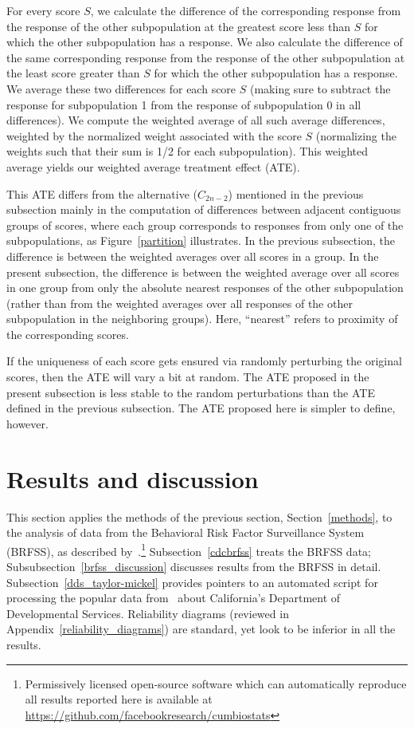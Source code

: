 \documentclass[]{fairmeta}
\begin{document}
For every score $S$, we calculate the difference of the corresponding response
from the response of the other subpopulation at the greatest score less than
$S$ for which the other subpopulation has a response. We also calculate
the difference of the same corresponding response from the response
of the other subpopulation at the least score greater than $S$
for which the other subpopulation has a response.
We average these two differences for each score $S$
(making sure to subtract the response for subpopulation 1
from the response of subpopulation 0 in all differences).
We compute the weighted average of all such average differences,
weighted by the normalized weight associated with the score $S$
(normalizing the weights such that their sum is 1/2 for each subpopulation).
This weighted average yields our weighted average treatment effect (ATE).

This ATE differs from the alternative ($C_{2n-2}$) mentioned
in the previous subsection mainly in the computation of differences between
adjacent contiguous groups of scores, where each group corresponds to responses
from only one of the subpopulations, as Figure~\ref{partition} illustrates.
In the previous subsection, the difference is between the weighted averages
over all scores in a group. In the present subsection,
the difference is between the weighted average over all scores in one group
from only the absolute nearest responses of the other subpopulation
(rather than from the weighted averages over all responses
of the other subpopulation in the neighboring groups).
Here, ``nearest'' refers to proximity of the corresponding scores.

If the uniqueness of each score gets ensured via randomly perturbing
the original scores, then the ATE will vary a bit at random.
The ATE proposed in the present subsection is less stable
to the random perturbations than the ATE defined in the previous subsection.
The ATE proposed here is simpler to define, however.



\section{Results and discussion}
\label{results}

This section applies the methods of the previous section,
Section~\ref{methods}, to the analysis of data
from the Behavioral Risk Factor Surveillance System (BRFSS),
as described by~\cite{brfss}.\footnote{Permissively licensed
open-source software which can automatically reproduce all results
reported here is available at
\url{https://github.com/facebookresearch/cumbiostats}}
Subsection~\ref{cdcbrfss} treats the BRFSS data;
Subsubsection~\ref{brfss_discussion} discusses results from the BRFSS
in detail.
Subsection~\ref{dds_taylor-mickel} provides pointers to an automated script
for processing the popular data from~\cite{taylor-mickel}
about California's Department of Developmental Services.
Reliability diagrams (reviewed in Appendix~\ref{reliability_diagrams})
are standard, yet look to be inferior in all the results.
\end{document}
